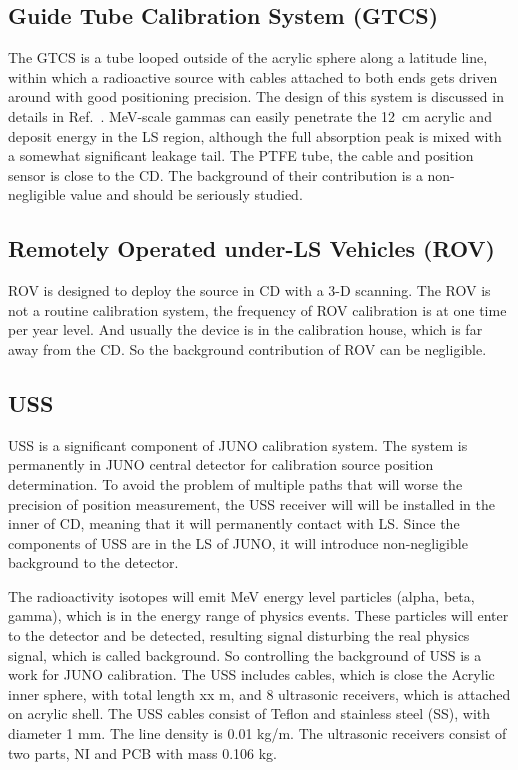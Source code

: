 \documentclass[review,number,sort&compress]{elsarticle}
\begin{document}
\subsection{Guide Tube Calibration System (GTCS)}
The GTCS is a tube looped outside of the acrylic sphere along a
latitude line, within which a radioactive source with cables attached
to both ends gets driven around with good positioning precision.  The
design of this system is discussed in details in
Ref.~\cite{GTCS}. MeV-scale gammas can easily penetrate the 12~cm acrylic
and deposit energy in the LS region, although the full absorption peak
is mixed with a somewhat significant leakage tail.
The PTFE tube, the cable and position sensor is close to the CD.
The background of their contribution is a non-negligible value and 
should be seriously studied.

\subsection{Remotely Operated under-LS Vehicles (ROV)}

ROV is designed to deploy the source in CD with a 3-D scanning.
The ROV is not a routine calibration system, the frequency of ROV calibration
is at one time per year level.
And usually the device is in the calibration house, which is far away from the CD.
So the background contribution of ROV can be negligible.

\subsection{USS}

USS is a significant component of JUNO calibration system. 
The system is permanently in JUNO central detector for calibration source position determination. 
To avoid the problem of multiple paths that will worse the precision of position measurement, 
the USS receiver will will be installed in the inner of CD, meaning that it will permanently contact with LS.
Since the components of USS are in the LS of JUNO, it will introduce non-negligible background to the detector. 

The radioactivity isotopes will emit MeV energy level particles (alpha, beta, gamma), which is in the energy range of physics events.
These particles will enter to the detector and be detected, resulting signal disturbing the real physics signal, which is called background. So controlling the background of USS is a work for JUNO calibration.
The USS includes cables, which is close the Acrylic inner sphere, with total length xx m, and 8 ultrasonic receivers, which is attached on acrylic shell. The USS cables consist of Teflon and stainless steel (SS), with diameter 1 mm. The line density is 0.01 kg/m. The ultrasonic receivers consist of two parts, NI and PCB with mass 0.106 kg. 
\end{document}
